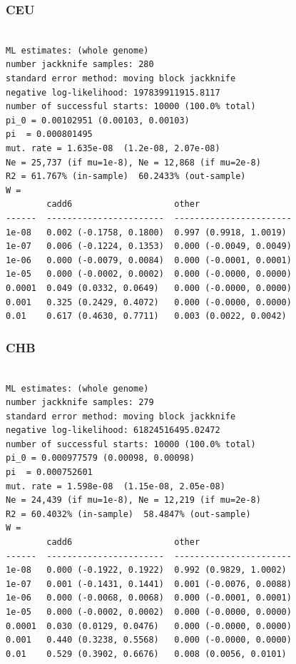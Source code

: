 \documentclass[11pt]{article}
\begin{document}
\subsubsection*{CEU}
\begin{minipage}{\linewidth}\begin{footnotesize}
\begin{verbatim}

ML estimates: (whole genome)
number jackknife samples: 280
standard error method: moving block jackknife
negative log-likelihood: 197839911915.8117
number of successful starts: 10000 (100.0% total)
pi_0 = 0.00102951 (0.00103, 0.00103)
pi  = 0.000801495
mut. rate = 1.635e-08  (1.2e-08, 2.07e-08)
Ne = 25,737 (if mu=1e-8), Ne = 12,868 (if mu=2e-8)
R2 = 61.767% (in-sample)  60.2433% (out-sample)
W = 
        cadd6                    other
------  -----------------------  -----------------------
1e-08   0.002 (-0.1758, 0.1800)  0.997 (0.9918, 1.0019)
1e-07   0.006 (-0.1224, 0.1353)  0.000 (-0.0049, 0.0049)
1e-06   0.000 (-0.0079, 0.0084)  0.000 (-0.0001, 0.0001)
1e-05   0.000 (-0.0002, 0.0002)  0.000 (-0.0000, 0.0000)
0.0001  0.049 (0.0332, 0.0649)   0.000 (-0.0000, 0.0000)
0.001   0.325 (0.2429, 0.4072)   0.000 (-0.0000, 0.0000)
0.01    0.617 (0.4630, 0.7711)   0.003 (0.0022, 0.0042)
\end{verbatim}
\end{footnotesize}\end{minipage}


\subsubsection*{CHB}
\begin{minipage}{\linewidth}\begin{footnotesize}
\begin{verbatim}

ML estimates: (whole genome)
number jackknife samples: 279
standard error method: moving block jackknife
negative log-likelihood: 61824516495.02472
number of successful starts: 10000 (100.0% total)
pi_0 = 0.000977579 (0.00098, 0.00098)
pi  = 0.000752601
mut. rate = 1.598e-08  (1.15e-08, 2.05e-08)
Ne = 24,439 (if mu=1e-8), Ne = 12,219 (if mu=2e-8)
R2 = 60.4032% (in-sample)  58.4847% (out-sample)
W = 
        cadd6                    other
------  -----------------------  -----------------------
1e-08   0.000 (-0.1922, 0.1922)  0.992 (0.9829, 1.0002)
1e-07   0.001 (-0.1431, 0.1441)  0.001 (-0.0076, 0.0088)
1e-06   0.000 (-0.0068, 0.0068)  0.000 (-0.0001, 0.0001)
1e-05   0.000 (-0.0002, 0.0002)  0.000 (-0.0000, 0.0000)
0.0001  0.030 (0.0129, 0.0476)   0.000 (-0.0000, 0.0000)
0.001   0.440 (0.3238, 0.5568)   0.000 (-0.0000, 0.0000)
0.01    0.529 (0.3902, 0.6676)   0.008 (0.0056, 0.0101)
\end{verbatim}
\end{footnotesize}\end{minipage}
\end{document}
